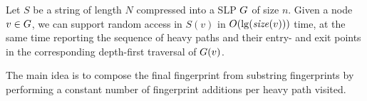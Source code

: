 
\begin{lemma}\label{lem:slp:random}
Let $S$ be a string of length $N$ compressed into a SLP $G$ of size $n$. Given a node $v \in G$, we can support random access in $S(v)$ in $O(\lg (\mathit{size}(v)))$ time, at the same time reporting the sequence of heavy paths and their entry- and exit points in the corresponding depth-first traversal of $G(v)$.
\end{lemma}

\noindent The main idea is to compose the final fingerprint from substring fingerprints by performing a constant number of fingerprint additions per heavy path visited.


